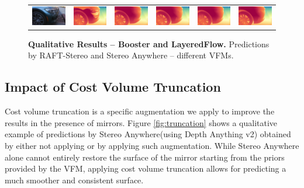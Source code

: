 \documentclass[10pt,twocolumn,letterpaper]{article}
\newcommand{\method}[0]{Stereo Anywhere\xspace}
\begin{document}
\begin{figure}[h]
\begin{tabular}{cccccc}
    \includegraphics[width=0.16\linewidth]{imgs/multiple_vfms/layered/337.jpg} &
    \includegraphics[width=0.16\linewidth]{imgs/multiple_vfms/layered/337_raft.jpg} &
    \includegraphics[width=0.16\linewidth]{imgs/multiple_vfms/layered/337_dav2.jpg} &
    \includegraphics[width=0.16\linewidth]{imgs/multiple_vfms/layered/337_depthpro.jpg} &
    \includegraphics[width=0.16\linewidth]{imgs/multiple_vfms/layered/337_moge.jpg} &
    \includegraphics[width=0.16\linewidth]{imgs/multiple_vfms/layered/337_lotus.jpg} \\

    \end{tabular}\vspace{-0.3cm}
    \caption{\textbf{Qualitative Results -- Booster and LayeredFlow.} Predictions by RAFT-Stereo and \method{} -- different VFMs.}
    \label{fig:multiple_vfms}\vspace{-0.3cm}
\end{figure}

\subsection{Impact of Cost Volume Truncation}
\label{subsec:vol_trunc_qual}

Cost volume truncation is a specific augmentation we apply to improve the results in the presence of mirrors. Figure \ref{fig:truncation} shows a qualitative example of predictions by \method (using Depth Anything v2) obtained by either not applying or by applying such augmentation.
While \method alone cannot entirely restore the surface of the mirror starting from the priors provided by the VFM, applying cost volume truncation allows for predicting a much smoother and consistent surface.
\end{document}
